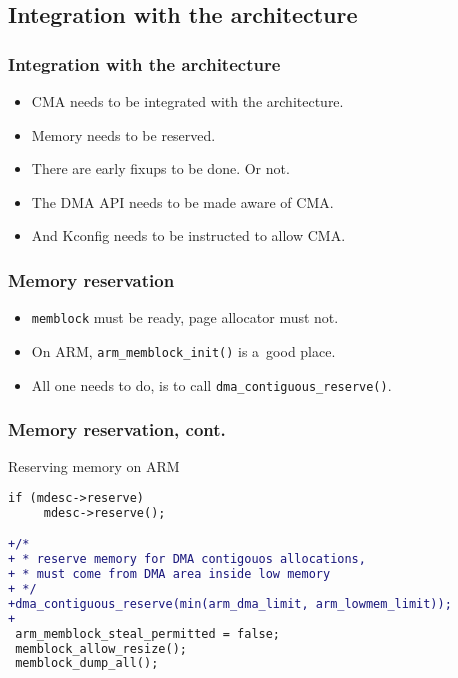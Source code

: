 \subsection{Integration with the architecture}

\begin{frame}
  \frametitle{Integration with the architecture}

  \begin{itemize}
  \item CMA needs to be integrated with the architecture.
  \item Memory needs to be reserved.
  \item There are early fixups to be done. {\footnotesize Or not.}
  \item The DMA API needs to be made aware of CMA.
  \item And Kconfig needs to be instructed to allow CMA.
  \end{itemize}
\end{frame}

\begin{frame}
  \frametitle{Memory reservation}

  \begin{itemize}
  \item \lstinline|memblock| must be ready, page allocator must not.
  \item On ARM, \lstinline|arm_memblock_init()| is a~good place.
  \item All one needs to do, is to call
    \lstinline|dma_contiguous_reserve()|.
  \end{itemize}
\end{frame}

\begin{frame}[fragile]
  \frametitle{Memory reservation, cont.}

  \begin{block}{Reserving memory on ARM}
\begin{lstlisting}[language=diff]
 if (mdesc->reserve)
     mdesc->reserve();

+/*
+ * reserve memory for DMA contigouos allocations,
+ * must come from DMA area inside low memory
+ */
+dma_contiguous_reserve(min(arm_dma_limit, arm_lowmem_limit));
+
 arm_memblock_steal_permitted = false;
 memblock_allow_resize();
 memblock_dump_all();
\end{lstlisting}
  \end{block}
\end{frame}


